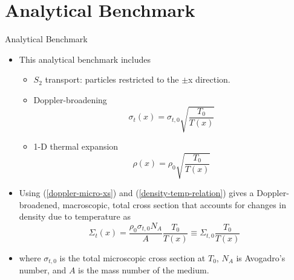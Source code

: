 \documentclass[9pt,t]{beamer}
\begin{document}
\section{Analytical Benchmark}
\begin{frame}{Analytical Benchmark}
    \pause
    \begin{itemize}
        \item <2-> This analytical benchmark includes
        \begin{itemize}
            \item <3-> $S_{2}$ transport: particles restricted to the $\pm$x direction.
            \item <4-> Doppler-broadening
            \begin{equation}\label{doppler-micro-xs}
                \sigma_{t}(x) = \sigma_{t,0}\sqrt{\frac{T_{0}}{T(x)}}
            \end{equation}
            \item <5-> 1-D thermal expansion
            \begin{equation} \label{density-temp-relation}
                \rho(x) =  \rho_{0} \sqrt{\frac{T_{0}}{T(x)}}
            \end{equation}
        \end{itemize}\vspace*{-0.4cm}
        \item <7->  Using (\ref{doppler-micro-xs}) and (\ref{density-temp-relation}) gives a Doppler-broadened, macroscopic, total cross section that accounts for changes in density due to temperature as
        \begin{equation}
            \Sigma_{t}(x) = \frac{\rho_{0}\sigma_{t,0} N_{A}}{A} \frac{T_{0}}{T(x)}
            \equiv\Sigma_{t,0}\frac{T_{0}}{T(x)}
        \end{equation}
        \item <7-> where $ \sigma_{t,0}$ is the total microscopic cross section at $T_{0}$, $N_{A}$ is Avogadro's number, and $A$ is the mass number
        of the medium.
        \end{itemize}
\end{frame}
\end{document}
